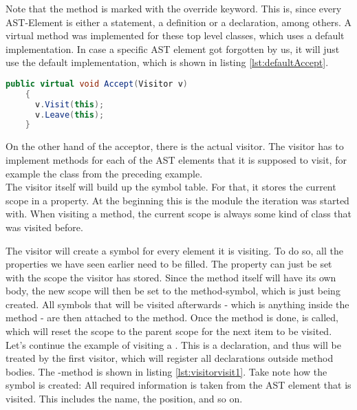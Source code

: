 Note that the method is marked with the override keyword.
This is, since every AST-Element is either a statement, a definition or a declaration, among others.
A virtual  method was implemented for these top level classes, which uses a default implementation.
In case a specific AST element got forgotten by us, it will just use the default implementation, which is shown in listing \ref{lst:defaultAccept}.

\begin{lstlisting}[language=csharp, caption={Default Accept}, captionpos=b, label={lst:defaultaccept}]
    public virtual void Accept(Visitor v)
    {
      v.Visit(this);
      v.Leave(this);
    }
\end{lstlisting}

On the other hand of the acceptor, there is the actual visitor.
The visitor has to implement  methods for each of the AST elements
that it is supposed to visit, for example the class  from the preceding example.\\

The visitor itself will build up the symbol table.
For that, it stores the current scope in a property.
At the beginning this is the module the iteration was started with.
When visiting a method, the current scope is always some kind of class that was visited before.

The visitor will create a symbol for every element it is visiting.
To do so, all the properties we have seen earlier need to be filled.
The property  can just be set with the scope the visitor has stored.
Since the method itself will have its own body, the new scope will then be set to the method-symbol, which is just being created.
All symbols that will be visited afterwards - which is anything inside the method - are then attached to the method.
Once the method is done,  is called, which will reset the scope to the parent scope for the next item to be visited.\\

Let's continue the example of visiting a .
This is a declaration, and thus will be treated by the first visitor, which will register all declarations outside method bodies.
The -method is shown in listing \ref{lst:visitorvisit1}.
Take note how the symbol is created: All required information is taken from the AST element  that is visited.
This includes the name, the position, and so on.\\

